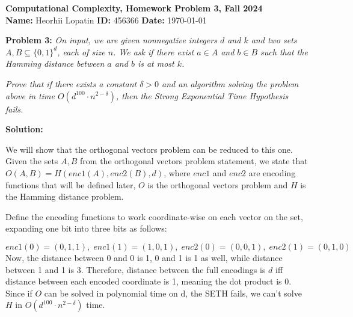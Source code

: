 \documentclass[12pt]{article}
\newcommand{\assignmentTitle}{Computational Complexity, Homework Problem 3, Fall 2024}
\newcommand{\studentName}{Heorhii Lopatin}
\newcommand{\studentID}{456366}
\newcommand{\submissionDate}{\today}
\newenvironment{problem}[1]{\noindent\textbf{Problem #1:} \itshape}{\par\vspace{10pt}}
\newenvironment{solution}{\noindent\textbf{Solution:} \par\vspace{10pt}}{\par\vspace{10pt}}
\begin{document}
\begin{center}
    {\Large \textbf{\assignmentTitle}}
    \\[10pt]
    \textbf{Name:} \studentName \hspace{1cm} \textbf{ID:} \studentID \hspace{1cm} \textbf{Date:} \submissionDate
\end{center}

\vspace{20pt}

\begin{problem}{3}
On input, we are given nonnegative integers \( d \) and \( k \) and two sets \( A, B \subseteq \{0, 1\}^d \), each of size \( n \). We ask if there exist \( a \in A \) and \( b \in B \) such that the Hamming distance between \( a \) and \( b \) is at most \( k \).

\textit{Prove that if there exists a constant \( \delta > 0 \) and an algorithm solving the problem above in time \( O(d^{100} \cdot n^{2-\delta}) \), then the Strong Exponential Time Hypothesis fails.}
\end{problem}

\vspace{20pt}

\begin{solution}
We will show that the orthogonal vectors problem can be reduced to this one. Given the sets $A, B$ from the orthogonal vectors problem statement, we state that  $O(A, B) = H(enc1(A), enc2(B), d)$, where $enc1$ and $enc2$ are encoding functions that will be defined later, $O$ is the orthogonal vectors problem and $H$ is the Hamming distance problem. 

Define the encoding functions to work coordinate-wise on each vector on the set, expanding one bit into three bits as follows: 

$$enc1(0)=(0, 1, 1), \; enc1(1)= (1, 0, 1), \; enc2(0)=(0, 0, 1), \; enc2(1)=(0, 1, 0)$$
Now, the distance between 0 and 0 is 1,  0 and 1 is 1 as well, while distance between 1 and 1 is 3. 
Therefore, distance between the full encodings is $d$ iff distance between each encoded coordinate is 1, meaning the dot product is 0. Since if $O$ can be solved in polynomial time on d, the SETH fails, we can't solve $H$ in $O(d^{100} \cdot n^{2-\delta})$ time. 
\end{solution}

\vspace{20pt}
\end{document}
